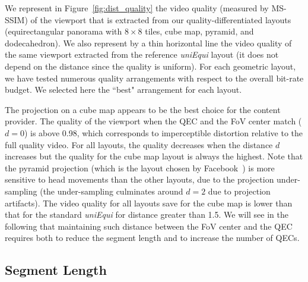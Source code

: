 We represent in Figure~\ref{fig:dist_quality} the video quality
(measured by \acs{MS-SSIM}) of the viewport that is extracted from our
quality-differentiated layouts (equirectangular panorama with
$8\!\times\! 8$ tiles, cube map, pyramid, and dodecahedron). We also
represent by a thin horizontal line the video quality of the same
viewport extracted from the reference \textit{uniEqui} layout (it does
not depend on the distance since the quality is uniform). For each
geometric layout, we have tested numerous quality arrangements with
respect to the overall bit-rate budget. We selected here the ``best"
arrangement for each layout. 

The projection on a cube map appears to be the best choice for the
content provider. The quality of the viewport when the \ac{QEC} and
the \ac{FoV} center match ($d=0$) is above \num{0.98}, which
corresponds to imperceptible distortion relative to the full quality
video. For all layouts, the quality decreases when the distance $d$
increases but the quality for the cube map layout is always the
highest. Note that the pyramid projection (which is the layout chosen
by Facebook~\cite{facebook}) is more sensitive to head movements than
the other layouts, due to the projection under-sampling (the
under-sampling culminates around $d=2$ due to projection artifacts).
The video quality for all layouts save for the cube map is lower than
that for the standard \emph{uniEqui} for distance greater than
\num{1.5}.  We will see in
the following that maintaining such distance between the \ac{FoV}
center and the \ac{QEC} requires both to reduce the segment length and
to increase the number of \acp{QEC}.

\subsection{Segment Length}
\label{subsec:segmentLength}

